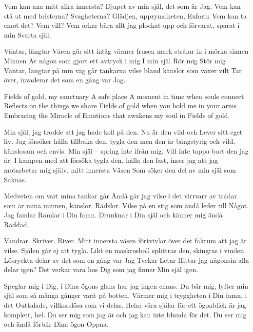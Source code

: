 \startpoem
Vem kan ana
mitt allra innersta?
Djupet av min själ, det som är 
Jag.
Vem kan stå ut med bristerna?
Svagheterna?
Glädjen, upprymdheten,
Euforin
Vem kan ta emot det?
Vem vill?
Vem orkar bära
allt jag plockat upp och förvarat,
sparat i min
Svarta själ.
\stoppoem

\startpoem
Väntar, längtar
Våren gör sitt intåg
värmer frusen mark
strålar in i mörka sinnen
Minnen
Av någon som gjort ett avtryck i mig
I min själ
Rör mig
Stör mig
Väntar, längtar
på min väg går tankarna vilse
bland känslor som växer vilt
Tar över, invaderar
det som en gång var
Jag.
\stoppoem

\startpoem
Fields of gold, my sanctuary
A safe place
A moment in time
when souls connect
Reflects on the things we share
Fields of gold
when you hold
me in your arms
Embracing the Miracle of
Emotions that awakens my soul
in Fields of gold.
\stoppoem

\startpoem
Min själ,
jag trodde att jag hade koll på den.
Nu är den vild och 
Lever sitt eget liv.
Jag försöker hålla tillbaka den, tygla den men
den är bångstyrig och vild, känslosam och envis.
Min själ – spring inte ifrån mig.
Vill inte tappa bort den jag är.
I kampen med att försöka tygla den, hålla den fast,
inser jag att jag motarbetar mig själv, mitt innersta
Väsen
Som söker den del av min själ som 
Saknas.
\stoppoem

\startpoem
Medveten om vart mina tankar går
Ändå går jag vilse i det virrvarr av
trådar som är mina minnen, känslor.
Rädslor.
Vilse på en stig som ändå leder till
Något.
Jag famlar
Ramlar
i Din famn.
Drunknar i Din själ och känner mig ändå
Räddad.
\stoppoem

\startpoem
Vandrar.
Skriver.
River.
Mitt innersta väsen förtvivlar
över det faktum att jag är vilse.
Själen går ej att tygla.
Likt en maskrosboll splittras den,
skingras i vinden.
Lösryckta delar av det som en gång var
Jag
Tvekar
Letar
Hittar jag någonsin alla delar igen?
Det verkar vara hos Dig som jag finner
Min själ igen.
\stoppoem

\startpoem
Speglar mig i Dig, i Dina ögons glans
har jag ingen chans.
Du bär mig, lyfter min själ
som så många gånger varit på botten.
Värmer mig i tryggheten i Din famn, i det
Outtalade, villkorslösa som vi delar.
Helar våra själar
för ett ögonblick är jag komplett, hel.
Du ser mig som jag är
och jag kan inte blunda för det.
Du ser mig och ändå
förblir Dina ögon
Öppna.
\stoppoem

